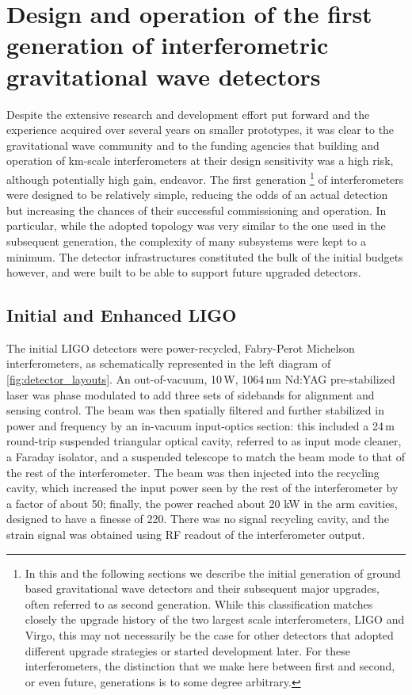 \section{Design and operation of the first generation of interferometric gravitational wave detectors}\label{subsec:1stgen}

Despite the extensive research and development effort put forward and the experience acquired over several years on smaller prototypes, it was clear to the gravitational wave community and to the funding agencies that building and operation of km-scale interferometers at their design sensitivity was a high risk, although potentially high gain, endeavor.
The first generation
\footnote{In this and the following sections we describe the initial generation of ground based gravitational wave detectors and their subsequent major upgrades, often referred to as second generation. While this classification matches closely the upgrade history of the two largest scale interferometers, LIGO and Virgo, this may not necessarily be the case for other detectors that adopted different upgrade strategies or started development later. For these interferometers, the distinction that we make here between first and second, or even future, generations is to some degree arbitrary.
} 
of interferometers were designed to be relatively simple, reducing the odds of an actual detection but increasing the chances of their successful commissioning and operation.
In particular, while the adopted topology was very similar to the one used in the subsequent generation, the complexity of many subsystems were kept to a minimum.
The detector infrastructures constituted the bulk of the initial budgets however, and were built to be able to support future upgraded detectors.

\subsection{Initial and Enhanced LIGO}
The initial LIGO detectors\cite{Abbott_2004,Abbott_2009} were power-recycled, Fabry-Perot Michelson interferometers, as schematically represented in the left diagram of \autoref{fig:detector_layouts}.
An out-of-vacuum, 10\,W, 1064\,nm Nd:YAG pre-stabilized laser was phase modulated to add three sets of sidebands for alignment and sensing control.
The beam was then spatially filtered and further stabilized in power and frequency by an in-vacuum input-optics section: this included a 24\,m round-trip suspended triangular optical cavity, referred to as input mode cleaner, a Faraday isolator, and a suspended telescope to match the beam mode to that of the rest of the interferometer.
The beam was then injected into the recycling cavity, which increased the input power seen by the rest of the interferometer by a factor of about 50; finally, the power reached about 20 kW in the arm cavities, designed to have a finesse of 220. There was no signal recycling cavity, and the strain signal was obtained using RF readout of the interferometer output.

